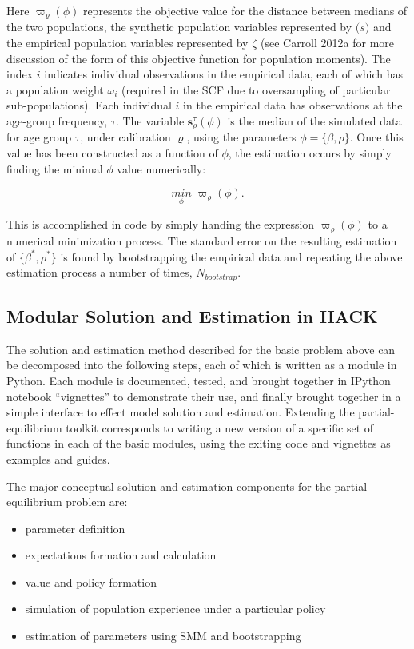 \documentclass[]{article}
\begin{document}
Here $\varpi_{\varrho}(\phi)$ represents the objective value for the
distance between medians of the two populations, the synthetic
population variables represented by $\mathbf({s})$ and the empirical
population variables represented by $\zeta$ (see Carroll 2012a for more
discussion of the form of this objective function for population
moments). The index $i$ indicates individual observations in the
empirical data, each of which has a population weight $\omega_i$
(required in the SCF due to oversampling of particular sub-populations).
Each individual $i$ in the empirical data has observations at the
age-group frequency, $\tau$. The variable
$\mathbf{s}_{\varrho}^\tau(\phi)$ is the median of the simulated data
for age group $\tau$, under calibration $\varrho$, using the parameters
$\phi = \{\beta, \rho\}$. Once this value has been constructed as a
function of $\phi$, the estimation occurs by simply finding the minimal
$\phi$ value numerically:

\[\underset{\phi}{min} \; \varpi_{\varrho}(\phi).\]

This is accomplished in code by simply handing the expression
$\varpi_{\varrho}(\phi)$ to a numerical minimization process. The
standard error on the resulting estimation of $\{\beta^{*}, \rho^{*}\}$
is found by bootstrapping the empirical data and repeating the above
estimation process a number of times, $N_{bootstrap}$.

\subsection{Modular Solution and Estimation in
HACK}\label{modular-solution-and-estimation-in-hack}

The solution and estimation method described for the basic problem above
can be decomposed into the following steps, each of which is written as
a module in Python. Each module is documented, tested, and brought
together in IPython notebook ``vignettes'' to demonstrate their use, and
finally brought together in a simple interface to effect model solution
and estimation. Extending the partial-equilibrium toolkit corresponds to
writing a new version of a specific set of functions in each of the
basic modules, using the exiting code and vignettes as examples and
guides.

The major conceptual solution and estimation components for the
partial-equilibrium problem are:

\begin{itemize}
\itemsep1pt\parskip0pt
\item
  parameter definition
\item
  expectations formation and calculation
\item
  value and policy formation
\item
  simulation of population experience under a particular policy
\item
  estimation of parameters using SMM and bootstrapping
\end{itemize}
\end{document}
